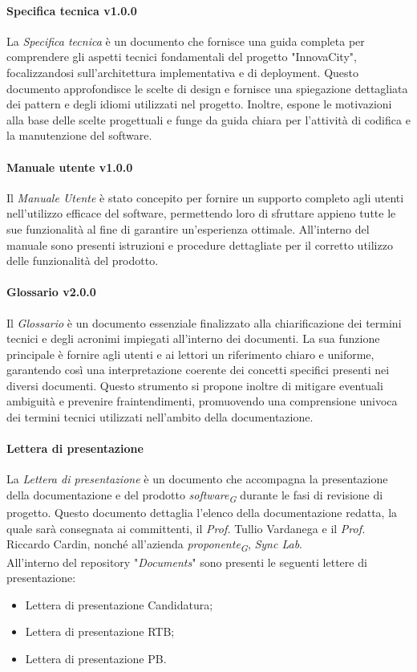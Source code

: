 \paragraph{Specifica tecnica v1.0.0}
La \textit{Specifica tecnica} è un documento che fornisce una guida completa per comprendere gli aspetti tecnici fondamentali del progetto "InnovaCity", focalizzandosi sull'architettura implementativa e di deployment. Questo documento approfondisce le scelte di design e fornisce una spiegazione dettagliata dei pattern e degli idiomi utilizzati nel progetto. Inoltre, espone le motivazioni alla base delle scelte progettuali e funge da guida chiara per l'attività di codifica e la manutenzione del software.

\paragraph{Manuale utente v1.0.0}
Il \textit{Manuale Utente} è stato concepito per fornire un supporto completo agli utenti nell’utilizzo efficace del software, permettendo loro di sfruttare appieno tutte le sue funzionalità al fine di garantire un’esperienza ottimale. All'interno del manuale sono presenti istruzioni e procedure dettagliate per il corretto utilizzo delle funzionalità del prodotto.

\paragraph{Glossario v2.0.0}
Il \textit{Glossario} è un documento essenziale finalizzato alla chiarificazione dei termini tecnici e degli acronimi impiegati all'interno dei documenti. La sua funzione principale è fornire agli utenti e ai lettori un riferimento chiaro e uniforme, garantendo così una interpretazione coerente dei concetti specifici presenti nei diversi documenti. Questo strumento si propone inoltre di mitigare eventuali ambiguità e prevenire fraintendimenti, promuovendo una comprensione univoca dei termini tecnici utilizzati nell'ambito della documentazione.

\paragraph{Lettera di presentazione}
La \textit{Lettera di presentazione} è un documento che accompagna la presentazione della documentazione e del prodotto \textit{software}\textsubscript{\textit{G}} durante le fasi di revisione di progetto. Questo documento dettaglia l'elenco della documentazione redatta, la quale sarà consegnata ai committenti, il \textit{Prof.} Tullio Vardanega e il \textit{Prof.} Riccardo Cardin, nonché all'azienda \textit{proponente}\textsubscript{\textit{G}}, \textit{Sync Lab}. \\
All'interno del repository "\textit{Documents}" sono presenti le seguenti lettere di presentazione:
\begin{itemize}
    \item Lettera di presentazione Candidatura;
    \item Lettera di presentazione RTB;
    \item Lettera di presentazione PB.
\end{itemize}

